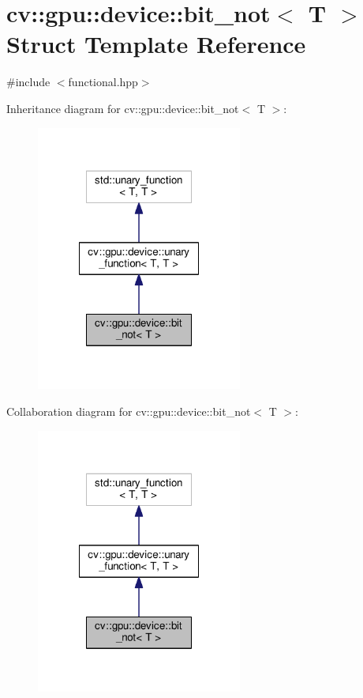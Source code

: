 \hypertarget{structcv_1_1gpu_1_1device_1_1bit__not}{\section{cv\-:\-:gpu\-:\-:device\-:\-:bit\-\_\-not$<$ T $>$ Struct Template Reference}
\label{structcv_1_1gpu_1_1device_1_1bit__not}
}


{\ttfamily \#include $<$functional.\-hpp$>$}



Inheritance diagram for cv\-:\-:gpu\-:\-:device\-:\-:bit\-\_\-not$<$ T $>$\-:\nopagebreak
\begin{figure}[H]
\begin{center}
\leavevmode
\includegraphics[width=192pt]{structcv_1_1gpu_1_1device_1_1bit__not__inherit__graph}
\end{center}
\end{figure}


Collaboration diagram for cv\-:\-:gpu\-:\-:device\-:\-:bit\-\_\-not$<$ T $>$\-:\nopagebreak
\begin{figure}[H]
\begin{center}
\leavevmode
\includegraphics[width=192pt]{structcv_1_1gpu_1_1device_1_1bit__not__coll__graph}
\end{center}
\end{figure}
